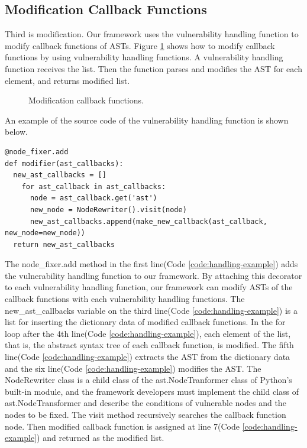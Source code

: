 \documentclass[conference]{IEEEtran}
\begin{document}
\subsection{Modification Callback Functions}
Third is modification.
Our framework uses the vulnerability handling function to modify callback functions of ASTs.
Figure \ref{fig:modification} shows how to modify callback functions by using vulnerability handling functions.
A vulnerability handling function receives the list.
Then the function parses and modifies the AST for each element, and returns modified list.
\begin{figure}[htbp]
\caption{Modification callback functions.}
\label{fig:modification}
\end{figure}
An example of the source code of the vulnerability handling function is shown below.
\begin{lstlisting}[caption={An example of a vulnerability handling function}, label=code:handling-example, captionpos=b]
@node_fixer.add
def modifier(ast_callbacks):
  new_ast_callbacks = []
    for ast_callback in ast_callbacks:
      node = ast_callback.get('ast')
      new_node = NodeRewriter().visit(node)
      new_ast_callbacks.append(make_new_callback(ast_callback, new_node=new_node))
  return new_ast_callbacks
\end{lstlisting}

The node\_fixer.add method in the first line(Code \ref{code:handling-example}) adds the vulnerability handling function to our framework.
By attaching this decorator to each vulnerability handling function, our framework can modify ASTs of the callback functions with each vulnerability handling functions.
The new\_ast\_callbacks variable on the third line(Code \ref{code:handling-example}) is a list for inserting the dictionary data of modified callback functions.
In the for loop after the 4th line(Code \ref{code:handling-example}), each element of the list, that is, the abstract syntax tree of each callback function, is modified.
The fifth line(Code \ref{code:handling-example}) extracts the AST from the dictionary data and the six line(Code \ref{code:handling-example}) modifies the AST.
The NodeRewriter class is a child class of the ast.NodeTranformer class of Python's built-in module, and the framework developers must implement the child class of ast.NodeTransformer and describe the conditions of vulnerable nodes and the nodes to be fixed.
The visit method recursively searches the callback function node.
Then modified callback function is assigned at line 7(Code \ref{code:handling-example}) and returned as the modified list.
\end{document}
